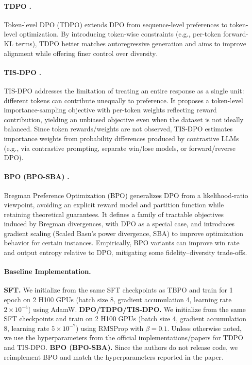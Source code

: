 \documentclass{article}
\theoremstyle{plain}
\theoremstyle{definition}
\theoremstyle{remark}
\begin{document}
\paragraph{TDPO \cite{zeng2024tokenleveldirectpreferenceoptimization}.}
Token-level DPO (TDPO) extends DPO from sequence-level preferences to token-level optimization. By introducing token-wise constraints (e.g., per-token forward-KL terms), TDPO better matches autoregressive generation and aims to improve alignment while offering finer control over diversity.
\paragraph{TIS-DPO \cite{tis-dpo}.}
TIS-DPO addresses the limitation of treating an entire response as a single unit: different tokens can contribute unequally to preference. It proposes a token-level importance-sampling objective with per-token weights reflecting reward contribution, yielding an unbiased objective even when the dataset is not ideally balanced. Since token rewards/weights are not observed, TIS-DPO estimates importance weights from probability differences produced by contrastive LLMs (e.g., via contrastive prompting, separate win/lose models, or forward/reverse DPO).
\paragraph{BPO (BPO-SBA) \cite{kim2025preferenceoptimizationestimatingratio}.}
Bregman Preference Optimization (BPO) generalizes DPO from a likelihood-ratio viewpoint, avoiding an explicit reward model and partition function while retaining theoretical guarantees. It defines a family of tractable objectives induced by Bregman divergences, with DPO as a special case, and introduces gradient scaling (Scaled Basu’s power divergence, SBA) to improve optimization behavior for certain instances. Empirically, BPO variants can improve win rate and output entropy relative to DPO, mitigating some fidelity--diversity trade-offs.

\paragraph{Baseline Implementation.}
\textbf{SFT.} We initialize from the same SFT checkpoints as TBPO and train for 1 epoch on 2 H100 GPUs (batch size 8, gradient accumulation 4, learning rate $2\times10^{-4}$) using AdamW.
\textbf{DPO/TDPO/TIS-DPO.} We initialize from the same SFT checkpoints and train on 2 H100 GPUs (batch size 4, gradient accumulation 8, learning rate $5\times10^{-7}$) using RMSProp with $\beta=0.1$. Unless otherwise noted, we use the hyperparameters from the official implementations/papers for TDPO and TIS-DPO.
\textbf{BPO (BPO-SBA).} Since the authors do not release code, we reimplement BPO and match the hyperparameters reported in the paper.
\end{document}
